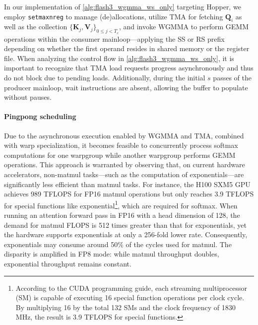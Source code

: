 \begin{enumerate}
In our implementation of \cref{alg:flash3_wgmma_ws_only} targeting Hopper, we employ \verb|setmaxnreg| to manage (de)allocations, utilize TMA for fetching $\mathbf{Q}_i$ as well as the collection $\{ \mathbf{K}_j, \mathbf{V}_j \}_{0 \leq j < T_c}$, and invoke WGMMA to perform GEMM operations within the consumer mainloop—applying the SS or RS prefix depending on whether the first operand resides in shared memory or the register file. When analyzing the control flow in \cref{alg:flash3_wgmma_ws_only}, it is important to recognize that TMA load requests progress asynchronously and thus do not block due to pending loads. Additionally, during the initial $s$ passes of the producer mainloop, wait instructions are absent, allowing the buffer to populate without pauses.

\paragraph{Pingpong scheduling} Due to the asynchronous execution enabled by WGMMA and TMA, combined with warp specialization, it becomes feasible to concurrently process softmax computations for one warpgroup while another warpgroup performs GEMM operations. This approach is warranted by observing that, on current hardware accelerators, non-matmul tasks—such as the computation of exponentials—are significantly less efficient than matmul tasks. For instance, the H100 SXM5 GPU achieves 989 TFLOPS for FP16 matmul operations but only reaches 3.9 TFLOPS for special functions like exponential\footnote{According to the CUDA programming guide, each streaming multiprocessor (SM) is capable of executing 16 special function operations per clock cycle. By multiplying 16 by the total 132 SMs and the clock frequency of 1830 MHz, the result is 3.9 TFLOPS for special functions.}, which are required for softmax. When running an attention forward pass in FP16 with a head dimension of 128, the demand for matmul FLOPS is 512 times greater than that for exponentials, yet the hardware supports exponentials at only a 256-fold lower rate. Consequently, exponentials may consume around 50\% of the cycles used for matmul. The disparity is amplified in FP8 mode: while matmul throughput doubles, exponential throughput remains constant.


\end{enumerate}
